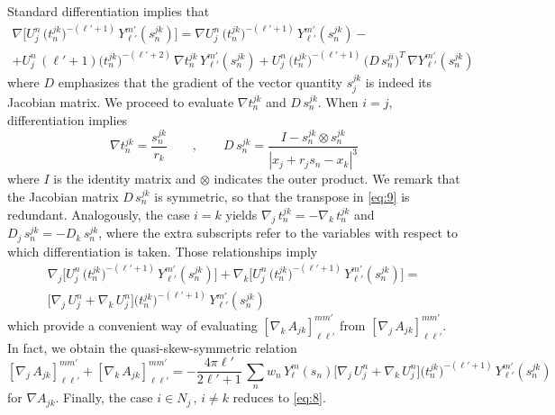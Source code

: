 Standard differentiation implies that
\begin{multline}\label{eq:9}
\nabla \Big[ U_j^n  \,  \big( t_n^{jk}\big)^{-(\ell'+1)} \, Y_{\ell'}^{m'} (s_n^{jk}) \Big] = \nabla U_j^n  \,  \big( t_n^{jk}\big)^{-(\ell'+1)} \, Y_{\ell'}^{m'} (s_n^{jk}) - \\
+ U_j^n  \, (\ell' + 1)  \big( t_n^{jk}\big)^{-(\ell'+2)} \, \nabla t_n^{jk} \, Y_{\ell'}^{m'} (s_n^{jk}) + U_j^n  \,  \big( t_n^{jk}\big)^{-(\ell'+1)} \, \big( D\, s_n^{ji} \big)^T\, \nabla Y_{\ell'}^{m'} (s_n^{jk})
\end{multline}
where $D$ emphasizes that the gradient of the vector quantity $s_j^{jk}$ is indeed its Jacobian matrix. We proceed to evaluate $\nabla t_n^{jk}$ and $ D \, s_n^{jk}$. When $i = j$, differentiation implies
\[
\nabla t_n^{jk} = \frac{s_n^{jk}}{r_k} \qquad , \qquad D \, s_n^{jk} = \frac{I - s_n^{jk} \otimes s_n^{jk} }{|x_j + r_j s_n - x_k|^3}
\]
where $I$ is the identity matrix and $\otimes$ indicates the outer product. We remark that the Jacobian matrix $D \, s_n^{jk}$ is symmetric, so that the transpose in \eqref{eq:9} is redundant. Analogously, the case $i = k$ yields $\nabla_{\! j} \, t_n^{jk} = - \nabla_{\! k} \, t_n^{jk}$ and $D_j \, s_n^{jk} = - D_k \, s_n^{jk}$, where the extra subscripts refer to the variables with respect to which differentiation is taken. Those relationships imply
\begin{multline*}
\nabla_{\! j} \Big[ U_j^n  \,  \big( t_n^{jk}\big)^{-(\ell'+1)} \, Y_{\ell'}^{m'} (s_n^{jk}) \Big] + \nabla_{\! k} \Big[ U_j^n  \,  \big( t_n^{jk}\big)^{-(\ell'+1)} \, Y_{\ell'}^{m'} (s_n^{jk}) \Big] = \\
  \Big[ \nabla_{\! j} \, U_j^n + \nabla_{\! k} \, U_j^n  \Big]  \big( t_n^{jk}\big)^{-(\ell'+1)} \, Y_{\ell'}^{m'} (s_n^{jk})
\end{multline*}
which provide a convenient way of evaluating $[\nabla_{\! k} \, A_{jk}]_{\ell \ell'}^{m m'}$ from $[\nabla_{\! j} \, A_{jk}]_{\ell \ell'}^{m m'}$. In fact, we obtain the quasi-skew-symmetric relation
\[
[ \nabla_{\! j} \, A_{jk}]_{\ell \ell'}^{m m'} + [\nabla_{\! k} \, A_{jk}]_{\ell \ell'}^{m m'} = -  \frac{4 \pi \ell'}{2 \ell'+1} \, \sum_{n} w_n\, Y_\ell^m(s_n) \Big[ \nabla_{\! j} \, U_j^n + \nabla_{\! k} \, U_j^n  \Big]  \big( t_n^{jk}\big)^{-(\ell'+1)} \, Y_{\ell'}^{m'} (s_n^{jk})
\]
for $\nabla A_{jk}$. Finally, the case $i \in N_j \, , \, i \not= k$ reduces to \eqref{eq:8}.